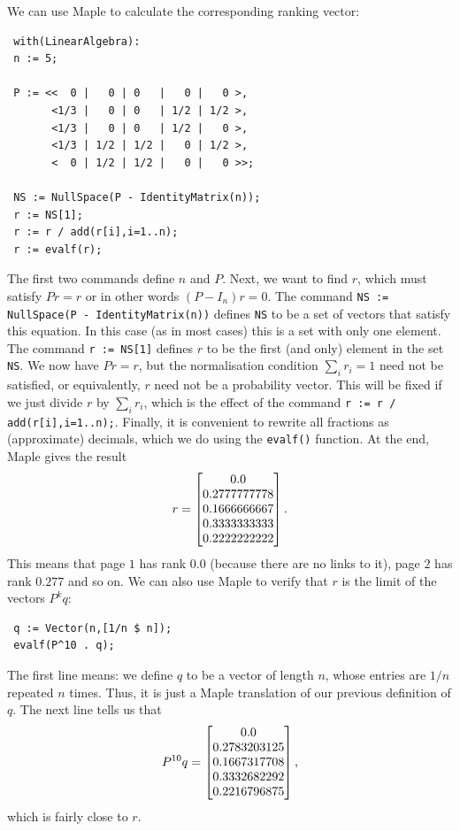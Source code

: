 \documentclass[reqno]{amsart}
\theoremstyle{definition}
\begin{document}
We can use Maple to calculate the corresponding ranking vector:
\begin{verbatim}
 with(LinearAlgebra):
 n := 5;

 P := <<  0 |   0 | 0   |   0 |   0 >,
       <1/3 |   0 | 0   | 1/2 | 1/2 >,
       <1/3 |   0 | 0   | 1/2 |   0 >,
       <1/3 | 1/2 | 1/2 |   0 | 1/2 >,
       <  0 | 1/2 | 1/2 |   0 |   0 >>;

 NS := NullSpace(P - IdentityMatrix(n));
 r := NS[1];
 r := r / add(r[i],i=1..n);
 r := evalf(r);
\end{verbatim}
The first two commands define $n$ and $P$.  Next, we want to find $r$,
which must satisfy $Pr=r$ or in other words $(P-I_n)r=0$.  The command 
\verb+NS := NullSpace(P - IdentityMatrix(n))+ defines \verb+NS+ 
to be a set of vectors that satisfy this equation.  In this case (as
in most cases) this is a set with only one element.  The command
\verb+r := NS[1]+ defines $r$ to be the first (and only) element in
the set \verb+NS+.  We now have $Pr=r$, but the normalisation
condition $\sum_ir_i=1$ need not be satisfied, or equivalently, $r$
need not be a probability vector.  This will be fixed if we just
divide $r$ by $\sum_ir_i$, which is the effect of the command 
\verb+r := r / add(r[i],i=1..n);+.  Finally, it is convenient to
rewrite all fractions as (approximate) decimals, which we do using the
\verb+evalf()+ function.  At the end, Maple gives the result
\[ r = \left[\begin{matrix}  0.0 \\
             0.2777777778 \\
             0.1666666667 \\
             0.3333333333 \\
             0.2222222222
       \end{matrix}\right].
\]
This means that page $1$ has rank $0.0$ (because there are no links to
it), page $2$ has rank $0.277$ and so on.  We can also use Maple to
verify that $r$ is the limit of the vectors $P^kq$:
\begin{verbatim}
 q := Vector(n,[1/n $ n]);
 evalf(P^10 . q);
\end{verbatim}
The first line means: we define $q$ to be a vector of length $n$,
whose entries are $1/n$ repeated $n$ times.  Thus, it is just a Maple
translation of our previous definition of $q$.  The next line tells us
that 
\[ P^{10} q = \left[\begin{matrix}
    0.0 \\
    0.2783203125 \\
    0.1667317708 \\
    0.3332682292 \\
    0.2216796875
   \end{matrix}\right],
\]
which is fairly close to $r$.
\end{document}
